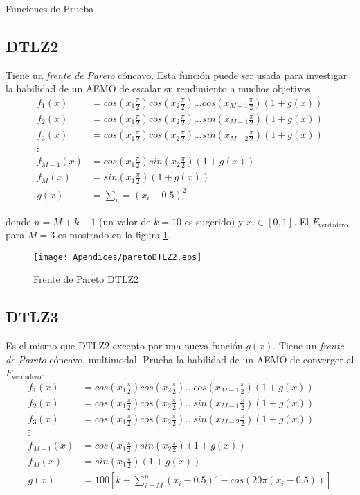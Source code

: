 \begin{chapter}{Funciones de Prueba}
\subsection*{DTLZ2}


Tiene un {\it frente de Pareto}  c\'oncavo. Esta funci\'on puede ser usada para investigar la habilidad de un AEMO de escalar su rendimiento a 
muchos objetivos.\\


\begin{align*}
f_1(x)&=cos(x_1\frac{\pi}{2})cos(x_2\frac{\pi}{2})\hdots cos(x_{M-1}\frac{\pi}{2})(1+g(x))\\
f_2(x)&=cos(x_1\frac{\pi}{2})cos(x_2\frac{\pi}{2})\hdots sin(x_{M-1}\frac{\pi}{2})(1+g(x))\\
f_3(x)&=cos(x_1\frac{\pi}{2})cos(x_2\frac{\pi}{2})\hdots sin(x_{M-2}\frac{\pi}{2})(1+g(x))\\
\vdots&\\
f_{M-1}(x)&=cos(x_1\frac{\pi}{2})sin(x_2\frac{\pi}{2})(1+g(x))\\
f_{M}(x)&=sin(x_1\frac{\pi}{2})(1+g(x))\\
g(x)&=\sum_i=(x_i-0.5)^2
\end{align*}


donde $n=M+k-1$ (un valor de $k=10$ es sugerido) y $x_i\in[0,1]$. El $F_\text{verdadero}$ para $M=3$ es mostrado en la figura \ref{fig:DTLZ2}. 

\begin{figure}[h!]
 \centering
\texttt{[image: Apendices/paretoDTLZ2.eps]}
\caption{Frente de Pareto DTLZ2}
\label{fig:DTLZ2}
\end{figure}



\subsection*{DTLZ3}

Es el mismo que DTLZ2 excepto por una nueva funci\'on $g(x)$. Tiene un {\it frente de Pareto}  c\'oncavo, multimodal. Prueba la habilidad de un AEMO de converger al $F_\text{verdadero}$.\\



\begin{align*}
f_1(x)&=cos(x_1\frac{\pi}{2})cos(x_2\frac{\pi}{2})\hdots cos(x_{M-1}\frac{\pi}{2})(1+g(x))\\
f_2(x)&=cos(x_1\frac{\pi}{2})cos(x_2\frac{\pi}{2})\hdots sin(x_{M-1}\frac{\pi}{2})(1+g(x))\\
f_3(x)&=cos(x_1\frac{\pi}{2})cos(x_2\frac{\pi}{2})\hdots sin(x_{M-2}\frac{\pi}{2})(1+g(x))\\
\vdots&\\
f_{M-1}(x)&=cos(x_1\frac{\pi}{2})sin(x_2\frac{\pi}{2})(1+g(x))\\
f_{M}(x)&=sin(x_1\frac{\pi}{2})(1+g(x))\\
g(x)&=100[k+\sum_{i=M}^n(x_i-0.5)^2-cos(20\pi(x_i-0.5))]
\end{align*}



\end{chapter}
